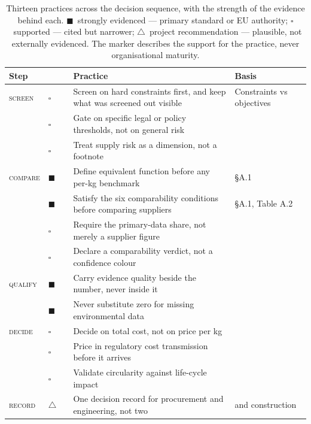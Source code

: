 \documentclass[10pt,twocolumn,a4paper]{article}
\newcommand{\dimhead}[1]{\textbf{#1}}
\begin{document}
\begin{table}[t]
  \caption{Thirteen practices across the decision sequence, with the strength of
  the evidence behind each. $\blacksquare$~strongly evidenced --- primary standard
  or EU authority; $\square$~supported --- cited but narrower; $\triangle$~project
  recommendation --- plausible, not externally evidenced. The marker describes the
  support for the practice, never organisational maturity.}
  \label{tab:practices}
  \small
  \begin{tabular}{@{}p{}p{}p{}p{}p{}@{}}
    \toprule
    \dimhead{Step} & & & \dimhead{Practice} & \dimhead{Basis} \\
    \midrule
    \textsc{screen}  & $\square$    & & Screen on hard constraints first, and keep what was screened out visible & Constraints vs objectives \cite{c6} \\
                     & $\square$    & & Gate on specific legal or policy thresholds, not on general risk & \cite{v2,p5} \\
                     & $\square$    & & Treat supply risk as a dimension, not a footnote & \cite{a3,c5} \\
    \addlinespace[2pt]
    \textsc{compare} & $\blacksquare$ & & Define equivalent function before any per-kg benchmark & \cite{p1} \S A.1 \\
                     & $\blacksquare$ & & Satisfy the six comparability conditions before comparing suppliers & \cite{p1} \S A.1, Table A.2 \\
                     & $\square$    & & Require the primary-data share, not merely a supplier figure & \cite{p3,b2} \\
                     & $\square$    & & Declare a comparability verdict, not a confidence colour & \cite{p1,p3} \\
    \addlinespace[2pt]
    \textsc{qualify} & $\blacksquare$ & & Carry evidence quality beside the number, never inside it & \cite{a2,p3} \\
                     & $\blacksquare$ & & Never substitute zero for missing environmental data & \cite{a2,e2} \\
    \addlinespace[2pt]
    \textsc{decide}  & $\square$    & & Decide on total cost, not on price per kg & \cite{a1} \\
                     & $\square$    & & Price in regulatory cost transmission before it arrives & \cite{a7,a6} \\
                     & $\square$    & & Validate circularity against life-cycle impact & \cite{p2,c1} \\
    \addlinespace[2pt]
    \textsc{record}  & $\triangle$  & & One decision record for procurement and engineering, not two & \cite{a1} and construction \\
    \bottomrule
  \end{tabular}
\end{table}
\end{document}
